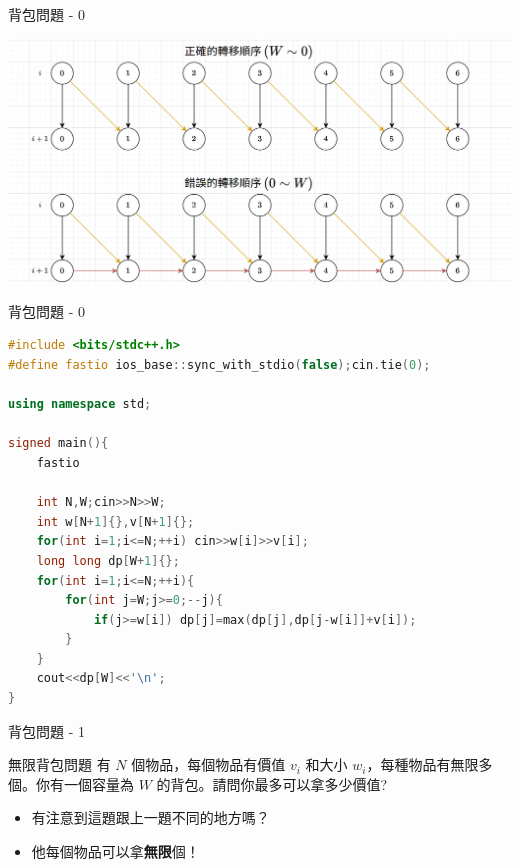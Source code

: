 \documentclass[aspectratio=169]{beamer}
\begin{document}
    \begin{frame}{背包問題 - 0}
        \begin{center}
            \includegraphics[scale=0.4]{images/rolling_01_knapsack_transition.png}
        \end{center}
    \end{frame}
    
    \begin{frame}[fragile]{背包問題 - 0}
        \begin{lstlisting}[language=C++, basicstyle=\ttfamily\tiny]
#include <bits/stdc++.h>
#define fastio ios_base::sync_with_stdio(false);cin.tie(0);

using namespace std;

signed main(){
    fastio

    int N,W;cin>>N>>W;
    int w[N+1]{},v[N+1]{};
    for(int i=1;i<=N;++i) cin>>w[i]>>v[i];
    long long dp[W+1]{};
    for(int i=1;i<=N;++i){
        for(int j=W;j>=0;--j){
            if(j>=w[i]) dp[j]=max(dp[j],dp[j-w[i]]+v[i]);
        }
    }
    cout<<dp[W]<<'\n';
}
        \end{lstlisting}
\end{frame}

    \begin{frame}{背包問題 - 1}
        \begin{block}{無限背包問題}
            有 $N$ 個物品，每個物品有價值 $v_i$ 和大小 $w_i$，每種物品有無限多個。你有一個容量為 $W$ 的背包。請問你最多可以拿多少價值?
        \end{block}
        \begin{itemize}
            \item<2-> 有注意到這題跟上一題不同的地方嗎？
            \item<3-> 他每個物品可以拿\textbf{無限}個！
        \end{itemize}
    \end{frame}
\end{document}

